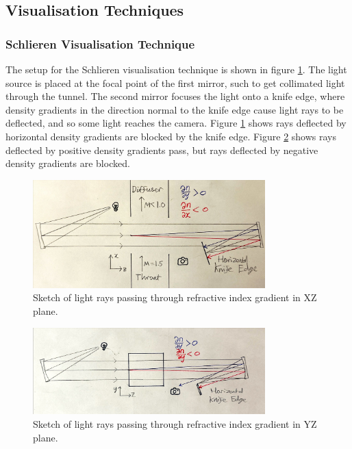 \documentclass{article}
\begin{document}
\subsection{Visualisation Techniques}

\subsubsection{Schlieren Visualisation Technique}

The setup for the Schlieren visualisation technique is shown in figure \ref{fig:xz_shlierian}.
The light source is placed at the focal point of the first mirror, such to get collimated light through the tunnel.
The second mirror focuses the light onto a knife edge, where density gradients in the direction normal to the knife edge cause light rays to be deflected, and so some light reaches the camera.
Figure \ref{fig:xz_shlierian} shows rays deflected by horizontal density gradients are blocked by the knife edge.
Figure \ref{fig:yz_shlierian} shows rays deflected by positive density gradients pass, but rays deflected by negative density gradients are blocked.

\begin{figure}[H]
    \centering
    \includegraphics[width=0.8\textwidth]{xz_shlierian.jpg}
    \caption{Sketch of light rays passing through refractive index gradient in XZ plane.}
    \label{fig:xz_shlierian}
\end{figure}

\begin{figure}[H]
    \centering
    \includegraphics[width=0.8\textwidth]{yz_shlierian.jpg}
    \caption{Sketch of light rays passing through refractive index gradient in YZ plane.}
    \label{fig:yz_shlierian}
\end{figure}
\end{document}
